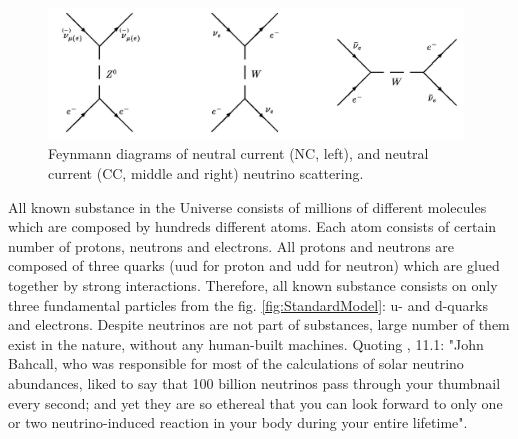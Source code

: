 \begin{figure}
\caption{Feynmann diagrams of neutral current (NC, left), and neutral current (CC, middle and right) neutrino scattering.}
\label{fig:NuScattering}
\centering
\includegraphics[width=0.98\textwidth, keepaspectratio=true]{figs/neutrinoScattering.png}
\end{figure}


All known substance in the Universe consists of millions of different molecules which are composed by hundreds different atoms. Each atom consists of certain number of protons, neutrons and electrons. All protons and neutrons are composed of three quarks (uud for proton and udd for neutron) which are glued together by strong interactions. Therefore, all known substance consists on only three fundamental particles from the fig. \ref{fig:StandardModel}: u- and d-quarks and electrons. Despite neutrinos are not part of substances, large number of them exist in the nature, without any human-built machines. Quoting \cite{ref_Griffiths}, 11.1: "John Bahcall, who was responsible for most of the calculations of solar neutrino abundances, liked to say that 100 billion neutrinos pass through your thumbnail every second; and yet they are so ethereal that you can look forward to only one or two neutrino-induced reaction in your body during your entire lifetime".\\
